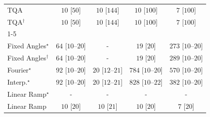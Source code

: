 \begin{tabular}{l|cccc|}
TQA & {\cellcolor[HTML]{F7FCF5}} \color[HTML]{000000} $10$ [$50$] & {\cellcolor[HTML]{F7FCF5}} \color[HTML]{000000} $10$ [$144$] & {\cellcolor[HTML]{F7FCF5}} \color[HTML]{000000} $10$ [$100$] & {\cellcolor[HTML]{F7FCF5}} \color[HTML]{000000} $7$ [$100$] \\
TQA$^\dagger$ & {\cellcolor[HTML]{F7FCF5}} \color[HTML]{000000} $10$ [$50$] & {\cellcolor[HTML]{F7FCF5}} \color[HTML]{000000} $10$ [$144$] & {\cellcolor[HTML]{F7FCF5}} \color[HTML]{000000} $10$ [$100$] & {\cellcolor[HTML]{F7FCF5}} \color[HTML]{000000} $7$ [$100$] \\
\cline{1-5}
\multicolumn{5}{c}{\rule{0pt}{8pt}SV} \\
\midrule
Fixed Angles$^\star$ & {\cellcolor[HTML]{EDF8EA}} \color[HTML]{000000} $64$ [$10$--$20$] & {\cellcolor[HTML]{000000}} \color[HTML]{F1F1F1} {\cellcolor{white}} \color{black} - & {\cellcolor[HTML]{F5FBF3}} \color[HTML]{000000} $19$ [$20$] & {\cellcolor[HTML]{B1E0AB}} \color[HTML]{000000} $273$ [$10$--$20$] \\
Fixed Angles$^\dagger$ & {\cellcolor[HTML]{EDF8EA}} \color[HTML]{000000} $64$ [$10$--$20$] & {\cellcolor[HTML]{000000}} \color[HTML]{F1F1F1} {\cellcolor{white}} \color{black} - & {\cellcolor[HTML]{F5FBF3}} \color[HTML]{000000} $19$ [$20$] & {\cellcolor[HTML]{ABDDA5}} \color[HTML]{000000} $289$ [$10$--$20$] \\
Fourier$^\star$ & {\cellcolor[HTML]{E8F6E4}} \color[HTML]{000000} $92$ [$10$--$20$] & {\cellcolor[HTML]{F5FBF2}} \color[HTML]{000000} $20$ [$12$--$21$] & {\cellcolor[HTML]{005522}} \color[HTML]{F1F1F1} $784$ [$10$--$20$] & {\cellcolor[HTML]{329B51}} \color[HTML]{F1F1F1} $570$ [$10$--$20$] \\
Interp.$^\star$ & {\cellcolor[HTML]{E8F6E4}} \color[HTML]{000000} $92$ [$10$--$20$] & {\cellcolor[HTML]{F5FBF2}} \color[HTML]{000000} $20$ [$12$--$21$] & {\cellcolor[HTML]{00441B}} \color[HTML]{F1F1F1} $828$ [$10$--$22$] & {\cellcolor[HTML]{84CC83}} \color[HTML]{000000} $382$ [$10$--$20$] \\
Linear Ramp$^\star$ & {\cellcolor[HTML]{000000}} \color[HTML]{F1F1F1} {\cellcolor{white}} \color{black} - & {\cellcolor[HTML]{000000}} \color[HTML]{F1F1F1} {\cellcolor{white}} \color{black} - & {\cellcolor[HTML]{000000}} \color[HTML]{F1F1F1} {\cellcolor{white}} \color{black} - & {\cellcolor[HTML]{000000}} \color[HTML]{F1F1F1} {\cellcolor{white}} \color{black} - \\
Linear Ramp & {\cellcolor[HTML]{F7FCF5}} \color[HTML]{000000} $10$ [$20$] & {\cellcolor[HTML]{F7FCF5}} \color[HTML]{000000} $10$ [$21$] & {\cellcolor[HTML]{F7FCF5}} \color[HTML]{000000} $10$ [$20$] & {\cellcolor[HTML]{F7FCF5}} \color[HTML]{000000} $7$ [$20$] \\

\end{tabular}

